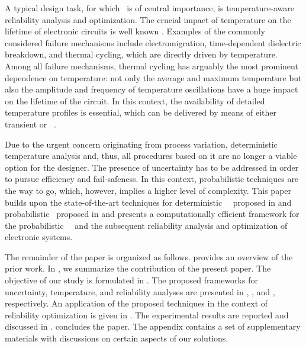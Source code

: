 A typical design task, for which \ta\ is of central importance, is temperature-aware reliability analysis and optimization.
The crucial impact of temperature on the lifetime of electronic circuits is well known \cite{jedec}.
Examples of the commonly considered failure mechanisms include electromigration, time-dependent dielectric breakdown, and thermal cycling, which are directly driven by temperature.
Among all failure mechanisms, thermal cycling has arguably the most prominent dependence on temperature: not only the average and maximum temperature but also the amplitude and frequency of temperature oscillations have a huge impact on the lifetime of the circuit.
In this context, the availability of detailed temperature profiles is essential, which can be delivered by means of either transient or \DSS\ \ta.

Due to the urgent concern originating from process variation, deterministic temperature analysis and, thus, all procedures based on it are no longer a viable option for the designer.
The presence of uncertainty has to be addressed in order to pursue efficiency and fail-safeness.
In this context, probabilistic techniques are the way to go, which, however, implies a higher level of complexity.
This paper builds upon the state-of-the-art techniques for deterministic \DSS\ \ta\ proposed in \cite{ukhov2012} and probabilistic \tta\ proposed in \cite{ukhov2014} and presents a computationally efficient framework for the probabilistic \DSS\ \ta\ and the subsequent reliability analysis and optimization of electronic systems.

The remainder of the paper is organized as follows.
 provides an overview of the prior work.
In , we summarize the contribution of the present paper.
The objective of our study is formulated in .
The proposed frameworks for uncertainty, temperature, and reliability analyses are presented in , , and , respectively.
An application of the proposed techniques in the context of reliability optimization is given in .
The experimental results are reported and discussed in .
 concludes the paper.
The appendix contains a set of supplementary materials with discussions on certain aspects of our solutions.
